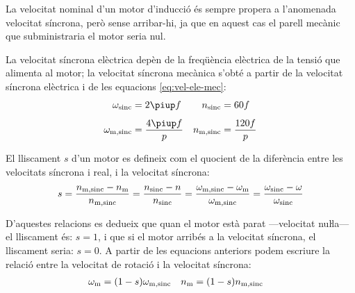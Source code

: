 La velocitat nominal d'un motor d'inducció és sempre propera a l'anomenada velocitat síncrona, però sense arribar-hi, ja que en aquest cas el parell mecànic que subministraria el motor seria nul.

La velocitat síncrona elèctrica depèn de la freqüència elèctrica de la tensió que alimenta al motor; la velocitat síncrona mecànica s'obté a partir de la velocitat síncrona elèctrica i de  les equacions \eqref{eq:vel-ele-mec}:
\begin{subequations}\index{motors d'inducció!velocitat síncrona}
\begin{align}
    \omega\ped{sinc} &= 2 \piup f & n\ped{sinc} &= 60 f \\[1ex]
    \omega\ped{m,sinc} &= \frac{4 \piup f}{p} & n\ped{m,sinc} &= \frac{120 f}{p}\label{eq:vel-mec-sinc}
\end{align}
\end{subequations}

El lliscament $s$ d'un motor es defineix com el quocient de la diferència entre les velocitats síncrona  i real, i la velocitat síncrona:
\begin{equation}\label{eq:lliscament}\index{lliscament}
    s = \frac{n\ped{m,sinc}-n\ped{m}}{n\ped{m,sinc}} =
    \frac{n\ped{sinc}-n}{n\ped{sinc}} =
    \frac{\omega\ped{m,sinc}-\omega\ped{m}}{\omega\ped{m,sinc}} =
    \frac{\omega\ped{sinc}-\omega}{\omega\ped{sinc}}
\end{equation}

D'aquestes relacions es dedueix que quan el motor està parat ---velocitat nuŀla--- el lliscament és: $s=1$, i que si el motor arribés a la velocitat síncrona, el lliscament seria: $s=0$. A partir de les equacions anteriors podem escriure la relació entre la velocitat de rotació i la velocitat síncrona:
\begin{align}
    \omega_\mathrm{m} &= (1-s) \omega_\mathrm{m,sinc} & n_\mathrm{m} &= (1-s) n_\mathrm{m,sinc} \label{eq:wm-wsinc}
\end{align}


